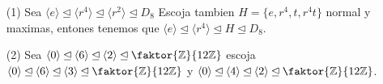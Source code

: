 \begin{example}\label{}
    \begin{enumerate}
        \item[(1)] Sea $\langle e \rangle \unlhd \langle r^4 \rangle \unlhd
            \langle r^2 \rangle \unlhd D_8$ Escoja tambien $H=\{e,r^4,t,r^4t\}$
            normal y maximas, entones tenemos que $\langle e \rangle \unlhd
            \langle r^4 \rangle \unlhd H \unlhd D_8$.

        \item[(2)] Sea $\langle 0 \rangle \unlhd \langle 6 \rangle \unlhd
            \langle 2 \rangle \unlhd \faktor{\Z}{12\Z}$ escoja $\langle 0
            \rangle \unlhd \langle 6 \rangle \unlhd \langle 3 \rangle \unlhd
            \faktor{\Z}{12\Z}$ y $\langle 0 \rangle \unlhd \langle 4 \rangle
            \unlhd \langle 2 \rangle \unlhd \faktor{\Z}{12\Z}$.
    \end{enumerate}
\end{example}
